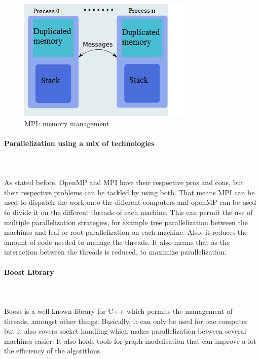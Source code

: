 \begin{figure}[!h] 
\centerline{\includegraphics[scale=0.85]{3_Software_considered/MultithreadingMP_boost_Visual_MPI_5000_Zotero_Project_Baptiste/MPI}}
   \caption{\label{étiquette} MPI: memory management}
\label{fig:MPI}
\end{figure}

\paragraph{Parallelization using a mix of technologies} \label{sec:hybrid}\mbox{}\\\mbox{}\\

As stated before, OpenMP and MPI have their respective pros and cons, but their respective problems can be tackled by using both. That means MPI can be used to dispatch the work onto the different computers and openMP can be used to divide it on the different threads of each machine. This can permit the use of multiple parallelization strategies, for example tree parallelization between the machines and leaf or root parallelization on each machine. Also, it reduces the amount of code needed to manage the threads. It also means that as the interaction between the threads is reduced, to maximize parallelization.

\paragraph{Boost Library}\mbox{}\\\mbox{}\\

Boost is a well known library for C++ which permits the management of threads, amongst other things. Basically, it can only be used for one computer but it also covers socket handling which makes parallelization between several machines easier. It also holds tools for graph modelisation that can improve a lot the efficiency of the algorithms.

